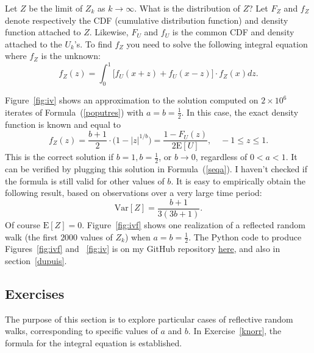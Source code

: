 \documentclass[oneside,10pt]{book}
\begin{document}
 Let $Z$ be the limit of $Z_k$ as $k\rightarrow\infty$.  What is the
 distribution of $Z$? Let $F_Z$ and $f_Z$ denote respectively the CDF (cumulative distribution function) and density function attached to $Z$.
 Likewise, $F_U$ and $f_U$ is the common CDF and density attached to the $U_k$'s. To find $f_Z$ you need to solve the following integral equation where $f_Z$ is the unknown:
\begin{equation}
f_Z(z) = \int_0^1 \Big[f_U(x+z) + f_U(x-z)\Big]\cdot f_Z(x) dz. \label{seqa}
\end{equation}

Figure~\ref{fig:iv} shows an approximation to the solution computed on $2\times 10^6$ iterates of Formula~(\ref{poputres}) with
$a=b=\frac{1}{2}$. In this case, the exact density function is known and equal to
$$
f_Z(z) = \frac{b+1}{2}\cdot \Big(1-|z|^{1/b}\Big) = \frac{1-F_U(z)}{2 \text{E}[U]}, \quad -1\leq z \leq 1.
$$
This is the correct solution if $b=1,b=\frac{1}{2}$, or $b\rightarrow 0$, regardless of $0<a<1$. It can be verified by plugging this solution in Formula~(\ref{seqa}). I haven't checked if the formula is still valid for other values of $b$. It is easy to empirically obtain the following result,
 based on observations over a very large time period:
$$
\text{Var}[Z] = \frac{b+1}{3(3b+1)}.
$$
Of course $\text{E}[Z]=0$. Figure~\ref{fig:ivf} shows one realization of a reflected random walk (the first $2000$ values of $Z_k$) when $a=b=\frac{1}{2}$. The Python code to produce Figures~\ref{fig:ivf} and ~\ref{fig:iv} is on my GitHub repository
 \href{https://github.com/VincentGranville/Stochastic-Processes/blob/master/brownian_reflective.py}{here}, and also in
 section~\ref{dupuis}.

\subsection{Exercises}

The purpose of this section is to explore particular cases of reflective random walks, corresponding to specific values of $a$ and $b$.
In Exercise~\ref{knorr}, the formula for the integral equation is established.
\end{document}
